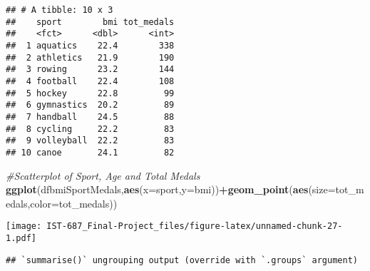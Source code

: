 \documentclass[]{article}
\newenvironment{Shaded}{\begin{snugshade}}{\end{snugshade}}
\newcommand{\CommentTok}[1]{\textcolor[rgb]{0.56,0.35,0.01}{\textit{#1}}}
\newcommand{\DataTypeTok}[1]{\textcolor[rgb]{0.13,0.29,0.53}{#1}}
\newcommand{\KeywordTok}[1]{\textcolor[rgb]{0.13,0.29,0.53}{\textbf{#1}}}
\newcommand{\NormalTok}[1]{#1}
\newcommand{\OperatorTok}[1]{\textcolor[rgb]{0.81,0.36,0.00}{\textbf{#1}}}
\newcommand{\StringTok}[1]{\textcolor[rgb]{0.31,0.60,0.02}{#1}}
\begin{document}
\begin{verbatim}
## # A tibble: 10 x 3
##    sport        bmi tot_medals
##    <fct>      <dbl>      <int>
##  1 aquatics    22.4        338
##  2 athletics   21.9        190
##  3 rowing      23.2        144
##  4 football    22.4        108
##  5 hockey      22.8         99
##  6 gymnastics  20.2         89
##  7 handball    24.5         88
##  8 cycling     22.2         83
##  9 volleyball  22.2         83
## 10 canoe       24.1         82
\end{verbatim}

\begin{Shaded}
\begin{Highlighting}[]
\CommentTok{#Scatterplot of Sport, Age and Total Medals}
\KeywordTok{ggplot}\NormalTok{(dfbmiSportMedals,}\KeywordTok{aes}\NormalTok{(}\DataTypeTok{x=}\NormalTok{sport,}\DataTypeTok{y=}\NormalTok{bmi))}\OperatorTok{+}\KeywordTok{geom_point}\NormalTok{(}\KeywordTok{aes}\NormalTok{(}\DataTypeTok{size=}\NormalTok{tot_medals,}\DataTypeTok{color=}\NormalTok{tot_medals))}
\end{Highlighting}
\end{Shaded}

\texttt{[image: IST-687\_Final-Project\_files/figure-latex/unnamed-chunk-27-1.pdf]}

\begin{Shaded}
\end{Shaded}

\begin{verbatim}
## `summarise()` ungrouping output (override with `.groups` argument)
\end{verbatim}

\begin{Shaded}
\end{Shaded}
\end{document}
